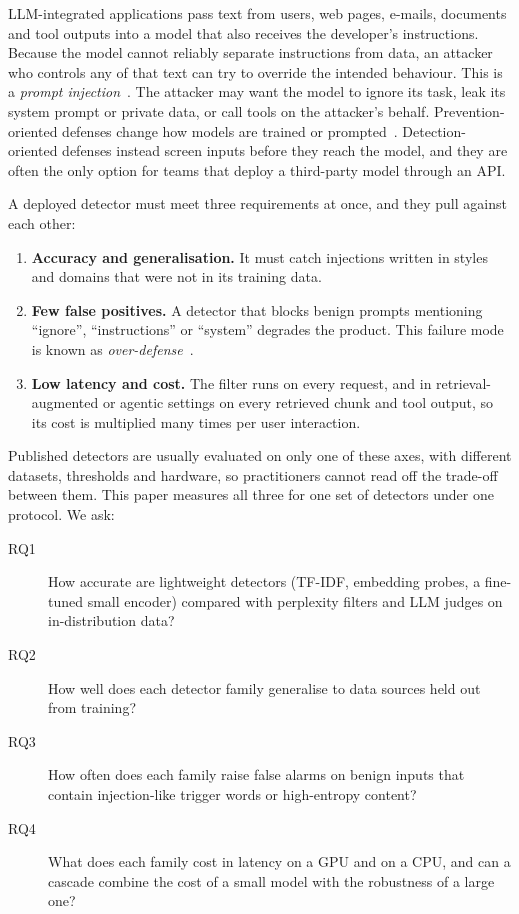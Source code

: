 \documentclass[11pt]{article}
\begin{document}
LLM-integrated applications pass text from users, web pages, e-mails, documents and tool
outputs into a model that also receives the developer's instructions. Because the
model cannot reliably separate instructions from data, an attacker who controls any of
that text can try to override the intended behaviour. This is a \emph{prompt
injection}~\citep{perez2022ignore,greshake2023not,liu2023houyi,liu2024formalizing}.
The attacker may want the model to ignore its task, leak its system prompt or private
data, or call tools on the attacker's behalf. Prevention-oriented defenses change how
models are trained or prompted~\citep{chen2024struq,wallace2024instruction,hines2024spotlighting}.
Detection-oriented defenses instead screen inputs before they reach the model, and they
are often the only option for teams that deploy a third-party model through an API.

A deployed detector must meet three requirements at once, and they pull against each
other:
\begin{enumerate}
  \item \textbf{Accuracy and generalisation.} It must catch injections written in styles
        and domains that were not in its training data.
  \item \textbf{Few false positives.} A detector that blocks benign prompts mentioning
        ``ignore'', ``instructions'' or ``system'' degrades the product. This failure mode
        is known as \emph{over-defense}~\citep{li2024injecguard}.
  \item \textbf{Low latency and cost.} The filter runs on every request, and in
        retrieval-augmented or agentic settings on every retrieved chunk and tool output,
        so its cost is multiplied many times per user interaction.
\end{enumerate}
Published detectors are usually evaluated on only one of these axes, with different
datasets, thresholds and hardware, so practitioners cannot read off the trade-off
between them. This paper measures all three for one set of detectors under one
protocol. We ask:
\begin{description}
  \item[RQ1] How accurate are lightweight detectors (TF-IDF, embedding probes, a fine-tuned
             small encoder) compared with perplexity filters and LLM judges on
             in-distribution data?
  \item[RQ2] How well does each detector family generalise to data sources held out from training?
  \item[RQ3] How often does each family raise false alarms on benign inputs that contain
             injection-like trigger words or high-entropy content?
  \item[RQ4] What does each family cost in latency on a GPU and on a CPU, and can a cascade
             combine the cost of a small model with the robustness of a large one?
\end{description}
\end{document}
